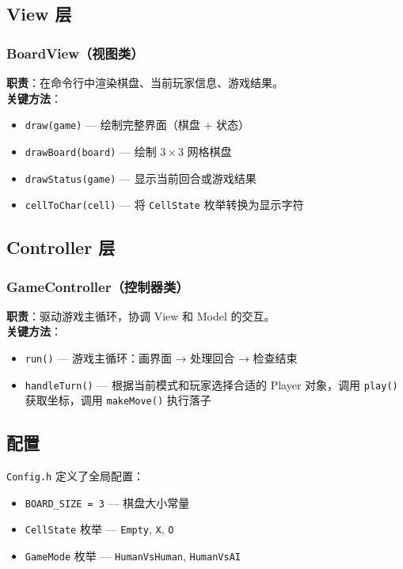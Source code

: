 \documentclass[12pt,a4paper]{ctexart}
\begin{document}
\subsection{View 层}

\subsubsection{BoardView（视图类）}
\textbf{职责}：在命令行中渲染棋盘、当前玩家信息、游戏结果。\\
\textbf{关键方法}：
\begin{itemize}[itemsep=2pt]
    \item \texttt{draw(game)} — 绘制完整界面（棋盘 + 状态）
    \item \texttt{drawBoard(board)} — 绘制 $3\times 3$ 网格棋盘
    \item \texttt{drawStatus(game)} — 显示当前回合或游戏结果
    \item \texttt{cellToChar(cell)} — 将 \texttt{CellState} 枚举转换为显示字符
\end{itemize}

\subsection{Controller 层}

\subsubsection{GameController（控制器类）}
\textbf{职责}：驱动游戏主循环，协调 View 和 Model 的交互。\\
\textbf{关键方法}：
\begin{itemize}[itemsep=2pt]
    \item \texttt{run()} — 游戏主循环：画界面 → 处理回合 → 检查结束
    \item \texttt{handleTurn()} — 根据当前模式和玩家选择合适的 Player 对象，调用 \texttt{play()} 获取坐标，调用 \texttt{makeMove()} 执行落子
\end{itemize}

\subsection{配置}

\texttt{Config.h} 定义了全局配置：
\begin{itemize}[itemsep=2pt]
    \item \texttt{BOARD\_SIZE = 3} — 棋盘大小常量
    \item \texttt{CellState} 枚举 — \texttt{Empty}, \texttt{X}, \texttt{O}
    \item \texttt{GameMode} 枚举 — \texttt{HumanVsHuman}, \texttt{HumanVsAI}
\end{itemize}
\end{document}
